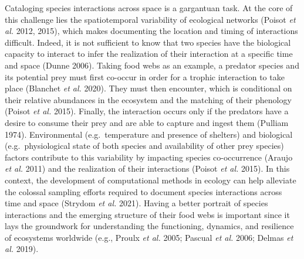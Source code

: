 \documentclass[10pt,oneside]{article}
\begin{document}
Cataloging species interactions across space is a gargantuan task. At
the core of this challenge lies the spatiotemporal variability of
ecological networks (Poisot \emph{et al.} 2012, 2015), which makes
documenting the location and timing of interactions difficult. Indeed,
it is not sufficient to know that two species have the biological
capacity to interact to infer the realization of their interaction at a
specific time and space (Dunne 2006). Taking food webs as an example, a
predator species and its potential prey must first co-occur in order for
a trophic interaction to take place (Blanchet \emph{et al.} 2020). They
must then encounter, which is conditional on their relative abundances
in the ecosystem and the matching of their phenology (Poisot \emph{et
al.} 2015). Finally, the interaction occurs only if the predators have a
desire to consume their prey and are able to capture and ingest them
(Pulliam 1974). Environmental (e.g.~temperature and presence of
shelters) and biological (e.g.~physiological state of both species and
availability of other prey species) factors contribute to this
variability by impacting species co-occurrence (Araujo \emph{et al.}
2011) and the realization of their interactions (Poisot \emph{et al.}
2015). In this context, the development of computational methods in
ecology can help alleviate the colossal sampling efforts required to
document species interactions across time and space (Strydom \emph{et
al.} 2021). Having a better portrait of species interactions and the
emerging structure of their food webs is important since it lays the
groundwork for understanding the functioning, dynamics, and resilience
of ecosystems worldwide (e.g., Proulx \emph{et al.} 2005; Pascual
\emph{et al.} 2006; Delmas \emph{et al.} 2019).
\end{document}

